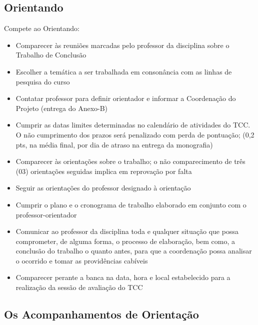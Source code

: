 \subsection{Orientando}

Compete ao Orientando:

	\begin{itemize}
		\item Comparecer às reuniões marcadas pelo professor da disciplina sobre o Trabalho de Conclusão
		
		\item Escolher a temática a ser trabalhada em consonância com as linhas de pesquisa do curso
		
		\item Contatar professor para definir orientador e informar a Coordenação do Projeto (entrega do Anexo-B)
		
		\item Cumprir as datas limites determinadas no calendário de atividades do TCC. O não cumprimento dos prazos será penalizado com perda de pontuação; 
		(0,2 pts, na média final, por dia de atraso na entrega da monografia)
		
		\item Comparecer às orientações sobre o trabalho; o não comparecimento de três (03) orientações seguidas implica em reprovação por falta
		
		\item Seguir as orientações do professor designado à orientação
		
		\item Cumprir o plano e o cronograma de trabalho elaborado em conjunto com o professor-orientador
		
		\item Comunicar ao professor da disciplina toda e qualquer situação que possa comprometer, de alguma forma, o processo de elaboração, bem como, a conclusão do 			trabalho o quanto antes, para que a coordenação possa analisar o ocorrido e tomar as providências cabíveis
		
		\item Comparecer perante a banca na data, hora e local estabelecido para a realização da sessão de avaliação do TCC
	\end{itemize}


\subsection{Os Acompanhamentos de Orientação}

